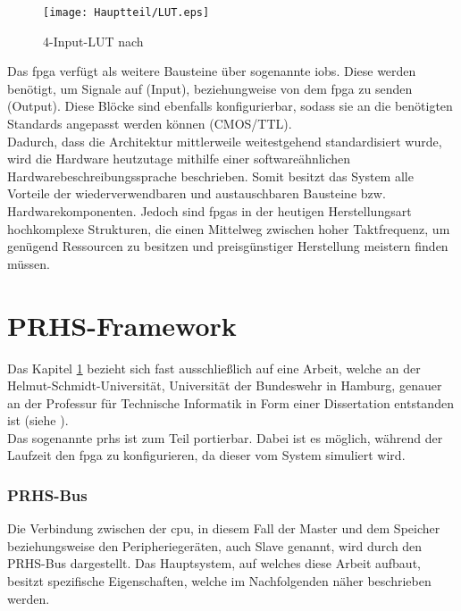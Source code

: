 \begin{figure}[h]
\centering
\texttt{[image: Hauptteil/LUT.eps]}
\caption{4-Input-LUT nach \cite{NI}}
\label{fig:lut}
\end{figure}

Das \ac{fpga} verfügt als weitere Bausteine über sogenannte \acp{iob}.
Diese werden benötigt, um Signale auf (Input), beziehungweise von dem \ac{fpga} zu senden (Output).
Diese Blöcke sind ebenfalls konfigurierbar, sodass sie an die benötigten Standards
angepasst werden können (CMOS/TTL).\\

Dadurch, dass die Architektur mittlerweile weitestgehend standardisiert wurde,
wird die Hardware heutzutage mithilfe einer softwareähnlichen Hardwarebeschreibungssprache beschrieben.
Somit besitzt das System alle
Vorteile der wiederverwendbaren und austauschbaren Bausteine bzw. Hardwarekomponenten.
Jedoch sind \acp{fpga} in der heutigen Herstellungsart hochkomplexe Strukturen,
die einen Mittelweg zwischen hoher Taktfrequenz, um genügend Ressourcen zu besitzen und
preisgünstiger Herstellung meistern finden müssen. \cite{mikro}\\

\section{PRHS-Framework}\label{kap:prhs}

Das Kapitel \ref{kap:prhs} bezieht sich fast ausschließlich auf eine Arbeit,
welche an der Helmut-Schmidt-Universität, Universität der Bundeswehr in Hamburg,
genauer an der Professur für Technische Informatik in Form einer Dissertation
entstanden ist (siehe \cite{MEckertDiss}).\\
Das sogenannte \ac{prhs} ist zum Teil portierbar. Dabei ist es möglich, während der Laufzeit den \ac{fpga} zu
konfigurieren, da dieser vom System simuliert wird.\cite{MEckertDiss}\\

\subsubsection{PRHS-Bus}

Die Verbindung zwischen der \ac{cpu}, in diesem Fall der Master und dem Speicher beziehungsweise den Peripheriegeräten,
auch Slave genannt, wird durch den PRHS-Bus dargestellt. Das Hauptsystem, auf welches diese Arbeit aufbaut,
besitzt spezifische Eigenschaften, welche im Nachfolgenden näher beschrieben werden.\\

